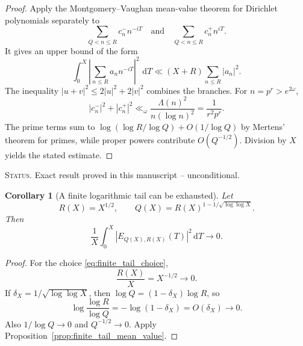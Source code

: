 \documentclass[11pt]{amsart}
\numberwithin{equation}{section}
\theoremstyle{plain}
\newtheorem{corollary}[theorem]{Corollary}
\theoremstyle{definition}
\theoremstyle{remark}
\newcommand{\1}{\mathbf{1}}
\newcommand{\dd}{\,\mathrm{d}}
\newcommand{\statusnote}[1]{%
  \par\smallskip\noindent
  \begingroup\footnotesize\textsc{Status.} #1\endgroup
  \par\smallskip}
\begin{document}
\begin{proof}
Apply the Montgomery--Vaughan mean-value theorem for Dirichlet polynomials
\cite[Chapter~7]{MontgomeryVaughan2007} separately to
\begin{equation}
\sum_{Q<n\leq R}c_n^-n^{-iT}
\quad\text{and}\quad
\sum_{Q<n\leq R}c_n^+n^{iT}.
\label{eq:MV_two_polynomials}
\end{equation}
It gives an upper bound of the form
\begin{equation}
\int_0^X\left|\sum_{n\leq R}a_nn^{-iT}\right|^2\,\dd T
\ll
(X+R)\sum_{n\leq R}|a_n|^2.
\label{eq:MV_mean_value_used}
\end{equation}
The inequality \(|u+v|^2\leq2|u|^2+2|v|^2\) combines the branches.  For
\(n=p^r>e^{2\omega}\),
\begin{equation}
|c_n^-|^2+|c_n^+|^2
\ll_\omega
\frac{\Lambda(n)^2}{n(\log n)^2}
=
\frac1{r^2p^r}.
\label{eq:finite_tail_coeff_square}
\end{equation}
The prime terms sum to
\(\log(\log R/\log Q)+O(1/\log Q)\) by Mertens' theorem for primes, while
proper powers contribute \(O(Q^{-1/2})\).  Division by \(X\) yields the
stated estimate.
\end{proof}

\statusnote{Exact result proved in this manuscript -- unconditional.}
\begin{corollary}[A finite logarithmic tail can be exhausted]
\label{cor:finite_log_tail_exhaustion}
Let
\begin{equation}
R(X)=X^{1/2},
\qquad
Q(X)=R(X)^{1-1/\sqrt{\log\log X}}.
\label{eq:finite_tail_choice}
\end{equation}
Then
\begin{equation}
\frac1X\int_0^X|E_{Q(X),R(X)}(T)|^2\dd T
\longrightarrow0.
\label{eq:finite_tail_exhaustion}
\end{equation}
\end{corollary}

\begin{proof}
For the choice \eqref{eq:finite_tail_choice},
\begin{equation}
\frac{R(X)}{X}=X^{-1/2}\longrightarrow0.
\label{eq:finite_tail_RX}
\end{equation}
If \(\delta_X=1/\sqrt{\log\log X}\), then
\(\log Q=(1-\delta_X)\log R\), so
\begin{equation}
\log\frac{\log R}{\log Q}
=
-\log(1-\delta_X)
=
O(\delta_X)\longrightarrow0.
\label{eq:finite_tail_log_ratio}
\end{equation}
Also \(1/\log Q\to0\) and \(Q^{-1/2}\to0\).  Apply
Proposition~\ref{prop:finite_tail_mean_value}.
\end{proof}
\end{document}
